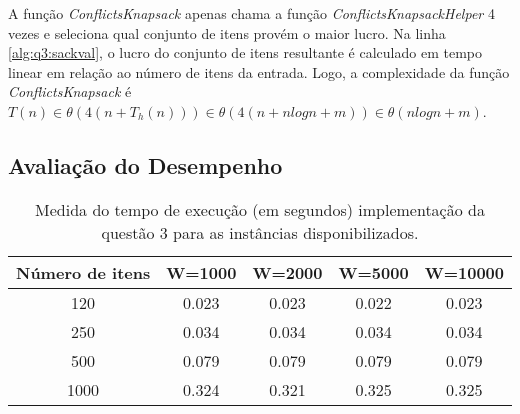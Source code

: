 \documentclass[a4paper]{article}
\begin{document}
A função \emph{ConflictsKnapsack} apenas chama a função \emph{ConflictsKnapsackHelper} 4 vezes e seleciona qual conjunto de itens provém o maior lucro. Na linha \ref{alg:q3:sackval}, o lucro do conjunto de itens resultante é calculado em tempo linear em relação ao número de itens da entrada. Logo, a complexidade da função \emph{ConflictsKnapsack} é $T(n) \in \theta(4(n + T_h(n))) \in \theta(4(n + nlogn + m)) \in \theta(nlogn + m)$.

\subsection{Avaliação do Desempenho}

\begin{table}[H]
\centering
\begin{tabular}{c|c|c|c|c}
Número de itens & W=1000 & W=2000 & W=5000 & W=10000 \\
\hline
120 & 0.023	& 0.023	& 0.022	& 0.023	\\
250 & 0.034	& 0.034	& 0.034	& 0.034	\\
500 & 0.079	& 0.079	& 0.079	& 0.079	\\
1000 & 0.324	& 0.321	& 0.325	& 0.325	\\
\end{tabular}
\caption{Medida do tempo de execução (em segundos) implementação da questão 3 para as instâncias disponibilizados.}
\label{tab:q3:bench}
\end{table}
\end{document}
